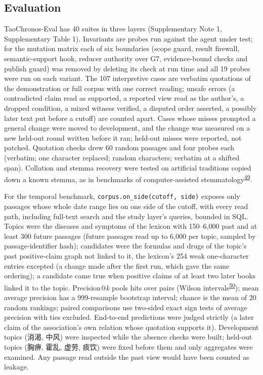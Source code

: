 \documentclass[
]{article}
\begin{document}
\hypertarget{evaluation}{%
\subsection{Evaluation}\label{evaluation}}

TaoChronos-Eval has 40 suites in three layers (Supplementary Note 1,
Supplementary Table 1). Invariants are probes run against the agent
under test; for the mutation matrix each of six boundaries (scope guard,
result firewall, semantic-support hook, reducer authority over G7,
evidence-bound checks and publish guard) was removed by deleting its
check at run time and all 19 probes were run on each variant. The 107
interpretive cases are verbatim quotations of the demonstration or full
corpus with one correct reading; unsafe errors (a contradicted claim
read as supported, a reported view read as the author's, a dropped
condition, a mixed witness verified, a disputed order asserted, a
possibly later text put before a cutoff) are counted apart. Cases whose
misses prompted a general change were moved to development, and the
change was measured on a new held-out round written before it ran;
held-out misses were reported, not patched. Quotation checks drew 60
random passages and four probes each (verbatim; one character replaced;
random characters; verbatim at a shifted span). Collation and stemma
recovery were tested on artificial traditions copied down a known
stemma, as in benchmarks of computer-assisted
stemmatology\textsuperscript{\protect\hyperlink{ref-roos2009stemmatology}{49}}.

For the temporal benchmark, \texttt{corpus.on\_side(cutoff,\ side)}
exposes only passages whose whole date range lies on one side of the
cutoff, with every read path, including full-text search and the study
layer's queries, bounded in SQL. Topics were the diseases and symptoms
of the lexicon with 150--6,000 past and at least 300 future passages
(future passages read up to 6,000 per topic, sampled by
passage-identifier hash); candidates were the formulas and drugs of the
topic's past positive-claim graph not linked to it, the lexicon's 254
weak one-character entries excepted (a change made after the first run,
which gave the same ordering); a candidate came true when positive
claims of at least two later books linked it to the topic.
Precision@\emph{k} pools hits over pairs (Wilson
intervals\textsuperscript{\protect\hyperlink{ref-wilson1927probable}{50}});
mean average precision has a 999-resample bootstrap interval; chance is
the mean of 20 random rankings; paired comparisons use two-sided exact
sign tests of average precision with ties excluded. End-to-end
predictions were judged strictly (a later claim of the association's own
relation whose quotation supports it). Development topics (消渴, 中风)
were inspected while the absence checks were built; held-out topics
(胸痹, 霍乱, 虚劳, 痰饮) were fixed before them and only aggregates were
examined. Any passage read outside the past view would have been counted
as leakage.
\end{document}
